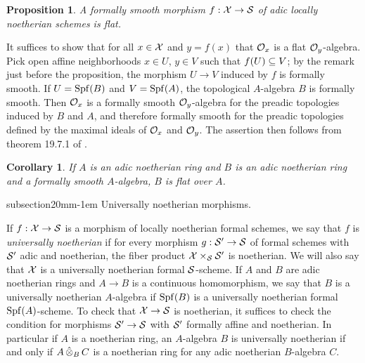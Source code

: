 \documentclass{article}
\makeatletter
\theoremstyle{change}
\newtheorem{prop}[subsubsection]{Proposition}
\newtheorem{cor}[subsubsection]{Corollary}
\renewcommand{\subsection}{\@startsection%
{subsection}{2}{0mm}{\baselineskip}{-1em}%
{\normalfont\normalsize\bfseries}}
\numberwithin{equation}{subsubsection}
\newcommand{\demobox}{\vrule height6pt width6pt depth0pt}
\newenvironment{demo}{\noindent{\it Proof.}}
{{\unskip\nobreak\hfil\qquad
\demobox\parfillskip=0pt\par}
\medskip}
\makeatother
\begin{document}
\begin{prop}\label{prop:formally-smooth-implies-flat}
  A formally smooth morphism $f:{\cal X}\to{\cal S}$ of adic locally noetherian
  schemes is flat.
\end{prop}
\begin{demo}
  It suffices to show that for all $x\in{\cal X}$ and $y=f(x)$ that ${\cal O}_x$
  is a flat ${\cal O}_y$-algebra. Pick open affine neighborhoods $x\in U$,
  $y\in V$ such that $f(U)\subseteq V$; by the remark just before the
  proposition, the morphism $U\to V$ induced by $f$ is formally
  smooth. If $U={\operatorname{Spf}({B})}$ and $V={\operatorname{Spf}({A})}$, the topological $A$-algebra
  $B$ is formally smooth. Then ${\cal O}_x$ is a formally smooth
  ${\cal O}_y$-algebra for the preadic topologies induced by $B$ and $A$,
  and therefore formally smooth for the preadic topologies defined by
  the maximal ideals of ${\cal O}_x$ and ${\cal O}_y$. The assertion then follows
  from theorem 19.7.1 of \cite[$0_{IV}$]{EGA}.
\end{demo}

\begin{cor}\label{cor:formally-smooth-implies-flat}
  If $A$ is an adic noetherian ring and $B$ is an adic noetherian ring
  and a formally smooth $A$-algebra, $B$ is flat over $A$.
\end{cor}

\subsection{Universally noetherian morphisms.}
\label{sec:formal-schemes-finiteness}

If $f:{\cal X}\to{\cal S}$ is a morphism of locally noetherian formal schemes,
we say that $f$ is \textit{universally noetherian} if for every
morphism $g:{\cal S}'\to{\cal S}$ of formal schemes with ${\cal S}'$ adic and
noetherian, the fiber product ${\cal X}\times_{\cal S}{\cal S}'$ is noetherian. We
will also say that ${\cal X}$ is a universally noetherian formal
${\cal S}$-scheme.  If $A$ and $B$ are adic noetherian rings and $A\to B$
is a continuous homomorphism, we say that $B$ is a universally
noetherian $A$-algebra if ${\operatorname{Spf}({B})}$ is a universally noetherian formal
${\operatorname{Spf}({A})}$-scheme. To check that ${\cal X}\to{\cal S}$ is noetherian, it suffices
to check the condition for morphisms ${\cal S}'\to{\cal S}$ with ${\cal S}'$ formally
affine and noetherian. In particular if $A$ is a noetherian ring, an
$A$-algebra $B$ is universally noetherian if and only if $A\mathop{\hat\otimes}_BC$
is a noetherian ring for any adic noetherian $B$-algebra $C$.
\end{document}
